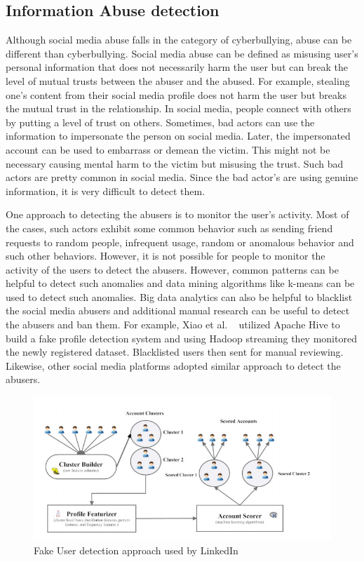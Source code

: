 \documentclass[sigconf]{acmart}
\begin{document}
\subsection{Information Abuse detection}
Although social media abuse falls in the category of cyberbullying, abuse can be different than cyberbullying. Social media abuse can be defined as misusing user's personal information that does not necessarily harm the user but can break the level of mutual trusts between the abuser and the abused. For example, stealing one's content from their social media profile does not harm the user but breaks the mutual trust in the relationship. In social media, people connect with others by putting a level of trust on others. Sometimes, bad actors can use the information to impersonate the person on social media. Later, the impersonated account can be used to embarrass or demean the victim. This might not be necessary causing mental harm to the victim but misusing the trust. Such bad actors are pretty common in social media. Since the bad actor's are using genuine information, it is very difficult to detect them.

One approach to detecting the abusers is to monitor the user's activity. Most of the cases, such actors exhibit some common behavior such as sending friend requests to random people, infrequent usage, random or anomalous behavior and such other behaviors. However, it is not possible for people to monitor the activity of the users to detect the abusers. However, common patterns can be helpful to detect such anomalies and data mining algorithms like k-means can be used to detect such anomalies. Big data analytics can also be helpful to blacklist the social media abusers and additional manual research can be useful to detect the abusers and ban them. For example, Xiao et al. ~\cite{Xiao:2015:DCF:2808769.2808779} utilized Apache Hive to build a fake profile detection system and using Hadoop streaming they monitored the newly registered dataset. Blacklisted users then sent for manual reviewing. Likewise, other social media platforms adopted similar approach to detect the abusers. 

\begin{figure}[!ht]
 \centering\includegraphics[width=\textwidth]{images/fakeuser.png}
  \caption{Fake User detection approach used by LinkedIn\cite{Xiao:2015:DCF:2808769.2808779}}
  \label{f:fake}
\end{figure}
\end{document}
